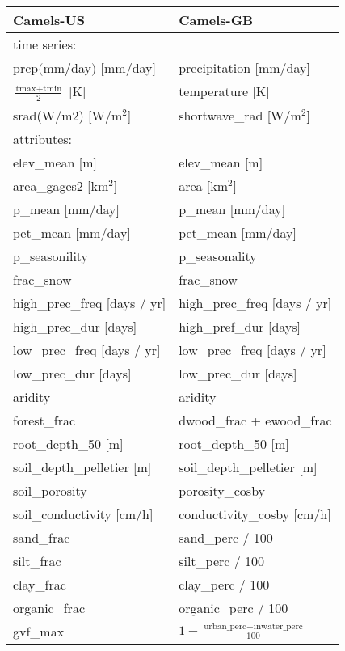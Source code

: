 \begin{tabular}{l|l}
\toprule
Camels-US &     Camels-GB \\
\midrule
time series: & \\
\midrule
prcp$($mm$/$day$)$ $[$mm$/$day$]$ & precipitation [mm/day] \\
    $\frac{\text{tmax} + \text{tmin}}{2}$ [K] & temperature [K]\\
    srad(W/m2) [W$/$m$^2$] & shortwave\_rad [W$/$m$^2$] \\
\midrule
    attributes: & \\
\midrule
elev\_mean [m]  & elev\_mean [m] \\
area\_gages2 [km$^2$] & area [km$^2$] \\
p\_mean [mm/day] & p\_mean [mm/day] \\
    pet\_mean [mm/day] & pet\_mean [mm/day] \\
p\_seasonility & p\_seasonality \\
frac\_snow & frac\_snow \\
    high\_prec\_freq [days / yr] & high\_prec\_freq [days / yr] \\
    high\_prec\_dur [days] & high\_pref\_dur [days]  \\
    low\_prec\_freq [days / yr] & low\_prec\_freq [days / yr] \\
    low\_prec\_dur [days] & low\_prec\_dur [days] \\
aridity & aridity \\
forest\_frac & dwood\_frac + ewood\_frac \\ 
root\_depth\_50 [m] & root\_depth\_50 [m] \\
soil\_depth\_pelletier [m] & soil\_depth\_pelletier [m] \\
soil\_porosity & porosity\_cosby \\
soil\_conductivity [cm/h] & conductivity\_cosby [cm/h] \\
sand\_frac & sand\_perc  / 100 \\
silt\_frac & silt\_perc / 100 \\ 
clay\_frac & clay\_perc  / 100 \\ 
organic\_frac & organic\_perc / 100 \\
    gvf\_max & $1 -\frac{\text{urban\_perc}+\text{inwater\_perc}}{100} $ \\
\end{tabular}

